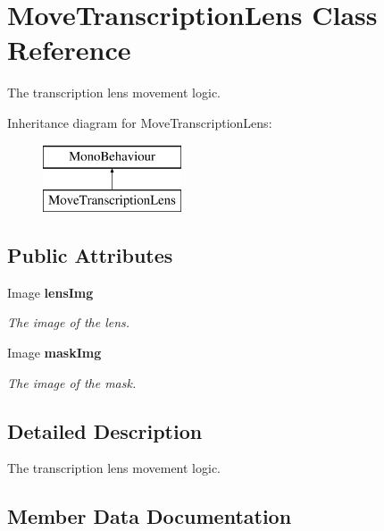 \section{Move\+Transcription\+Lens Class Reference}
\label{class_move_transcription_lens}


The transcription lens movement logic.  


Inheritance diagram for Move\+Transcription\+Lens\+:\begin{figure}[H]
\begin{center}
\leavevmode
\includegraphics[height=2.000000cm]{class_move_transcription_lens}
\end{center}
\end{figure}
\subsection*{Public Attributes}
\begin{DoxyCompactItemize}
\item 
Image {\bf lens\+Img}
\begin{DoxyCompactList}\small\item\em The image of the lens. \end{DoxyCompactList}\item 
Image {\bf mask\+Img}
\begin{DoxyCompactList}\small\item\em The image of the mask. \end{DoxyCompactList}\end{DoxyCompactItemize}


\subsection{Detailed Description}
The transcription lens movement logic. 



\subsection{Member Data Documentation}
